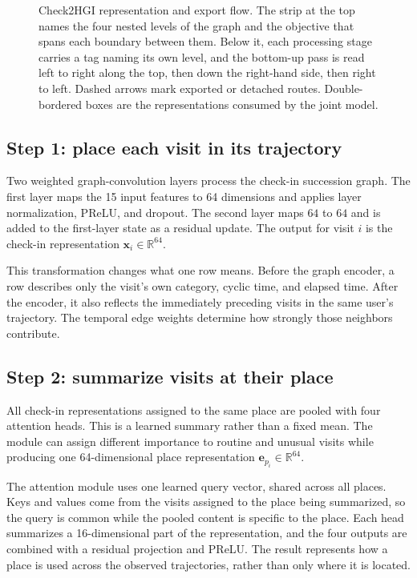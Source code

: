 \begin{figure}[H]
    \centering
    
    \caption{Check2HGI representation and export flow. The strip at the top names the
    four nested levels of the graph and the objective that spans each boundary between
    them. Below it, each processing stage carries a tag naming its own level, and the
    bottom-up pass is read left to right along the top, then down the right-hand side,
    then right to left. Dashed arrows mark exported or detached routes. Double-bordered
    boxes are the representations consumed by the joint model.}
    \label{fig:apx-check2hgi-flow}
\end{figure}

\subsection{Step 1: place each visit in its trajectory}

Two weighted graph-convolution layers process the check-in succession graph. The
first layer maps the 15 input features to 64 dimensions and applies layer
normalization, PReLU, and dropout. The second layer maps $64$ to $64$ and is added
to the first-layer state as a residual update. The output for visit $i$ is the
check-in representation $\mathbf{x}_i\in\mathbb{R}^{64}$.

This transformation changes what one row means. Before the graph encoder, a row
describes only the visit's own category, cyclic time, and elapsed time. After the
encoder, it also reflects the immediately preceding visits in the same user's
trajectory. The temporal edge weights determine how strongly those neighbors
contribute.

\subsection{Step 2: summarize visits at their place}

All check-in representations assigned to the same place are pooled with four
attention heads. This is a learned summary rather than a fixed mean. The module can
assign different importance to routine and unusual visits while producing one
64-dimensional place representation $\mathbf{e}_{p_i}\in\mathbb{R}^{64}$.

The attention module uses one learned query vector, shared across all places. Keys
and values come from the visits assigned to the place being summarized, so the query
is common while the pooled content is specific to the place. Each head summarizes a 16-dimensional
part of the representation, and the four outputs are combined with a residual
projection and PReLU. The result represents how a place is used across the observed
trajectories, rather than only where it is located.

